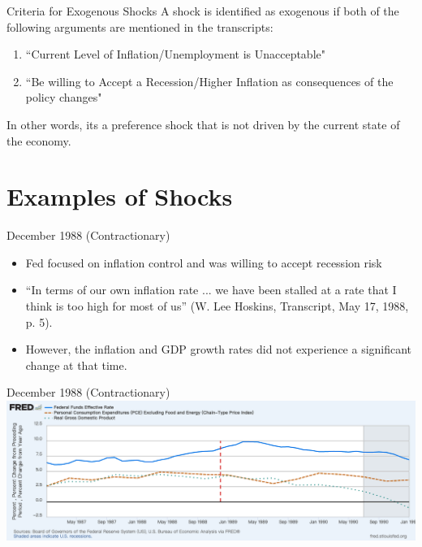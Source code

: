 \documentclass{beamer}
\begin{document}
\begin{frame}{Criteria for Exogenous Shocks}
    A shock is identified as exogenous if both of the following arguments are mentioned in the transcripts:
  \begin{enumerate}
    \item ``Current Level of Inflation/Unemployment is Unacceptable"
    \item ``Be willing to Accept a Recession/Higher Inflation as consequences of the policy changes" 
  \end{enumerate}
  In other words, its a preference shock that is not driven by the current state of the economy.
\end{frame}

\section{Examples of Shocks}

\begin{frame}{December 1988 (Contractionary)}
  \begin{itemize}
    \item Fed focused on inflation control and was willing to accept recession risk
    \item “In terms of our own inflation rate ... we have been stalled at a rate that I think is too high  for most of us” (W. Lee Hoskins, Transcript, May 17, 1988, p. 5).
    \item However, the inflation and GDP growth rates did not experience a significant change at that time.
  \end{itemize}

\end{frame}
\begin{frame}{December 1988 (Contractionary)}
  \centering
  \includegraphics[width=1\linewidth]{Graphs/Dec1988Shocks.png}
\end{frame}
\end{document}
